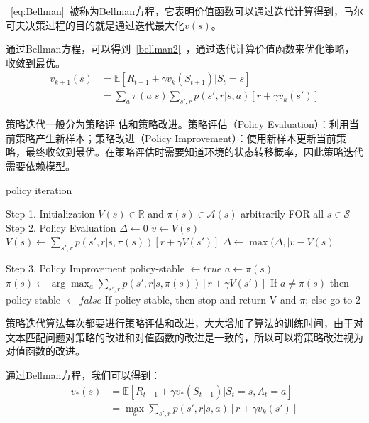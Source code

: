 ~\eqref{eq:Bellman}~被称为Bellman方程\cite{bellman1957markovian}，它表明价值函数可以通过迭代计算得到，马尔可夫决策过程的目的就是通过迭代最大化$v(s)$。

通过Bellman方程，可以得到~\eqref{bellman2}~，通过迭代计算价值函数来优化策略，收敛到最优。
\begin{equation}\label{bellman2}
\begin{aligned}
v_{k+1}(s) &= \mathbb{E}[R_{t+1}+\gamma v_k(S_{t+1})|S_t=s]\\
		   &= \sum_a \pi(a|s) \sum_{s',r}p(s',r|s,a)[r+\gamma v_k(s')]	
\end{aligned}		   
\end{equation}

策略迭代一般分为策略评 估和策略改进。策略评估（Policy Evaluation）：利用当前策略产生新样本；策略改进（Policy Improvement）：使用新样本更新当前策略，最终收敛到最优。在策略评估时需要知道环境的状态转移概率，因此策略迭代需要依赖模型。

\begin{algorithm}[H]
    \small
    \caption{policy iteration}\label{alg:policy_iteration}
    \begin{algorithmic}
        \STATE Step 1. Initialization
        	\STATE $V(s) \in \mathbb{R}$ and $\pi(s) \in \mathcal{A}(s)$ arbitrarily FOR all $s \in \mathcal{S}$
        \STATE Step 2. Policy Evaluation
        \REPEAT
        \STATE $\Delta \leftarrow 0$
        \STATE $v \leftarrow V(s)$
        \STATE $V(s)\leftarrow \sum_{s', r} p(s', r|s, \pi(s))[r + \gamma V(s')]$
        \STATE $\Delta \leftarrow \max(\Delta, |v-V(s)|$
        \ENDFOR

        \UNTIL{$\Delta < \theta$}

        \STATE Step 3. Policy Improvement
        \STATE policy-stable $\leftarrow  true$
        \STATE $a \leftarrow \pi(s)$
        \STATE $\pi(s) \leftarrow \arg\max_a\sum_{s', r}p(s', r|s, \pi(s))[r + \gamma V(s')]$
        \STATE If $a \neq \pi(s)$ then policy-stable $\leftarrow  false$
        \ENDFOR
        \STATE If policy-stable, then stop and return V and $\pi$; else go to 2
    \end{algorithmic}
\end{algorithm}

策略迭代算法每次都要进行策略评估和改进，大大增加了算法的训练时间，由于对文本匹配问题对策略的改进和对值函数的改进是一致的，所以可以将策略改进视为对值函数的改进。

通过Bellman方程，我们可以得到：
\begin{equation}\label{bellman_val}
	\begin{aligned}
		v_*(s) &= \mathbb{E}[R_{t+1}+\gamma v_*(S_{t+1})|S_t=s,A_t=a] \\
			   &= \max_a \sum_{s',r}p(s', r|s, a)[r+\gamma v_k(s')]
	\end{aligned}
\end{equation}

